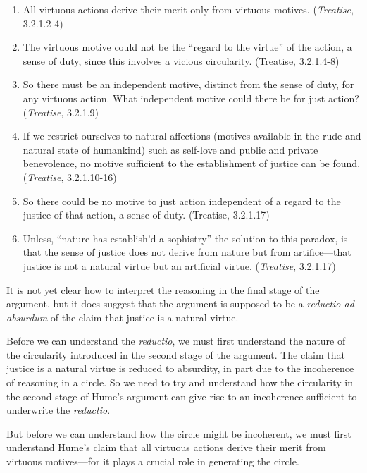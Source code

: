 \begin{enumerate}
    \item All virtuous actions derive their merit only from virtuous motives. (\emph{Treatise}, 3.2.1.2-4)
    \item The virtuous motive could not be the ``regard to the virtue'' of the action, a sense of duty, since this involves a vicious circularity. (Treatise, 3.2.1.4-8)
    \item So there must be an independent motive, distinct from the sense of duty, for any virtuous action. What independent motive could there be for just action? (\emph{Treatise}, 3.2.1.9)
    \item If we restrict ourselves to natural affections (motives available in the rude and natural state of humankind) such as self-love and public and private benevolence, no motive sufficient to the establishment of justice can be found. (\emph{Treatise}, 3.2.1.10-16)
    \item So there could be no motive to just action independent of a regard to the justice of that action, a sense of duty. (Treatise, 3.2.1.17)
    \item Unless, ``nature has establish'd a sophistry'' the solution to this paradox, is that the sense of justice does not derive from nature but from artifice---that justice is not a natural virtue but an artificial virtue. (\emph{Treatise}, 3.2.1.17)
\end{enumerate}

It is not yet clear how to interpret the reasoning in the final stage of the argument, but it does suggest that the argument is supposed to be a \emph{reductio ad absurdum} of the claim that justice is a natural virtue.

Before we can understand the \emph{reductio}, we must first understand the nature of the circularity introduced in the second stage of the argument. The claim that justice is a natural virtue is reduced to absurdity, in part due to the incoherence of reasoning in a circle. So we need to try and understand how the circularity in the second stage of Hume's argument can give rise to an incoherence sufficient to underwrite the \emph{reductio}.

But before we can understand how the circle might be incoherent, we must first understand Hume's claim that all virtuous actions derive their merit from virtuous motives---for it plays a crucial role in generating the circle. \change

% 

